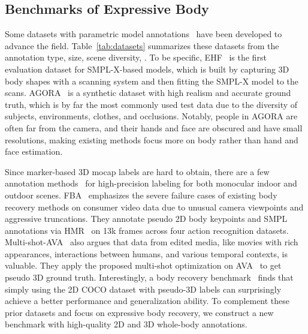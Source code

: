 \documentclass[10pt,twocolumn,letterpaper]{article}
\begin{document}
\subsection{Benchmarks of Expressive Body}

Some datasets with parametric model annotations~\cite{Patel_2021agora,Pavlakos_2019smplx,von_Marcard_3dpw,cai2022humman,Ionescu_2014_hm36,Moon_2022NeuralAnnot,HanbyulJoo2022eft} have been developed to advance the field. 
Table~\ref{tab:datasets} summarizes these datasets from the annotation type, size, scene diversity, \etc. 
To be specific, EHF~\cite{Pavlakos_2019smplx} is the first evaluation dataset for SMPL-X-based models, which is built by capturing 3D body shapes with a scanning system and then fitting the SMPL-X model to the scans.
AGORA~\cite{Patel_2021agora} is a synthetic dataset with high realism and accurate ground truth, which is by far the most commonly used test data due to the diversity of subjects, environments, clothes, and occlusions.
Notably, people in AGORA are often far from the camera, and their hands and face are obscured and have small resolutions, making existing methods focus more on body rather than hand and face estimation. 

Since marker-based 3D mocap labels are hard to obtain, there are a few annotation methods~\cite{Moon_2022NeuralAnnot,Pavlakos_2019smplx,Feng_2021_pixie,Muller_2021contact,rockwell2020full,pavlakos2022multishot} for high-precision labeling for both monocular indoor and outdoor scenes.
FBA~\cite{rockwell2020full} emphasizes the severe failure cases of existing body recovery methods on consumer video data due to unusual camera viewpoints and aggressive truncations. They annotate pseudo 2D body keypoints and SMPL annotations via HMR~\cite{Kanazawa_2018_hmr} on 13k frames across four action recognition datasets.
Multi-shot-AVA~\cite{pavlakos2022multishot} also argues that data from edited media, like movies with rich appearances,  interactions between humans, and various temporal contexts, is valuable. They apply the proposed multi-shot optimization on AVA~\cite{ChunhuiGu2017AVAAV} to get pseudo 3D ground truth.
Interestingly, a body recovery benchmark~\cite{pang2022benchmarking} finds that simply using the 2D COCO dataset with pseudo-3D labels can surprisingly achieve a better performance and generalization ability.
To complement these prior datasets and focus on expressive body recovery, we construct a new benchmark with high-quality 2D and 3D whole-body annotations.  
\end{document}
